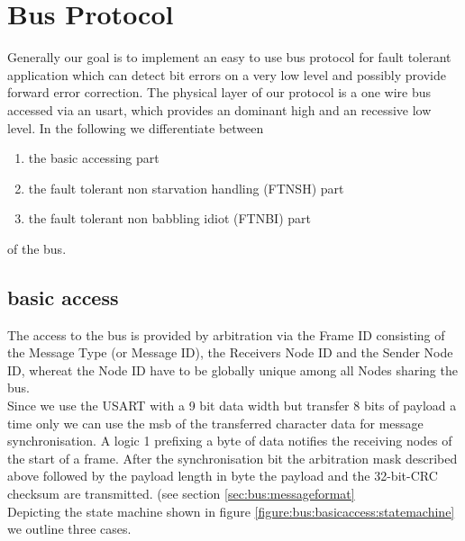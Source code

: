 \section{Bus Protocol}
\label{sec:bus}

Generally our goal is to implement an easy to use bus protocol for fault tolerant application which can detect bit errors on a very low level and possibly provide forward error correction.
The physical layer of our protocol is a one wire bus accessed via an usart, which provides an dominant high and an recessive low level.
In the following we differentiate between

\begin{enumerate}
 \item the basic accessing part 
 \item the fault tolerant non starvation handling (FTNSH) part
 \item the fault tolerant non babbling idiot (FTNBI) part
\end{enumerate}

of the bus.\\

\label{figure:bus:basicaccess:statemachine}


\subsection{basic access}
\label{sec:bus:basicaccess}

The access to the bus is provided by arbitration via the Frame ID consisting of the Message Type (or Message ID), the Receivers Node ID  and the Sender Node ID, whereat the Node ID have to be globally unique among all Nodes sharing the bus.\\
Since we use the USART with a 9 bit data width but transfer 8 bits of payload a time only we can use the msb of the transferred character data for message synchronisation. A logic 1 prefixing a byte of data notifies the receiving nodes of the start of a frame.
After the synchronisation bit the arbitration mask described above followed by the payload length in byte the payload and the 32-bit-CRC checksum are transmitted. (see section \ref{sec:bus:messageformat}\\

Depicting the state machine shown in figure \ref{figure:bus:basicaccess:statemachine} we outline three cases.

